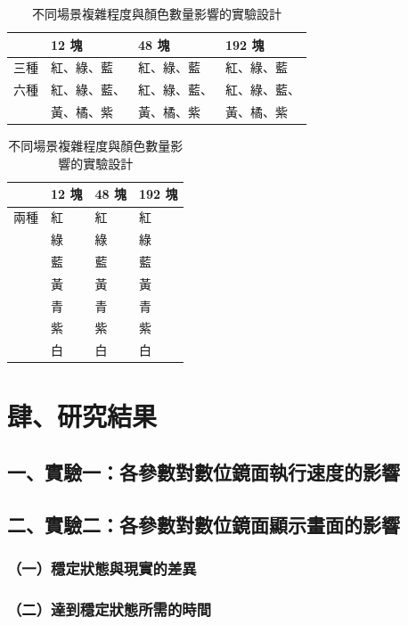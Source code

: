 \documentclass[12pt]{article}
\begin{document}
\begin{table}[h]
  \centering
  \caption{不同場景複雜程度與顏色數量影響的實驗設計}\label{table:sc3_des}
  \begin{tabular}{p{1cm}p{3cm}p{3cm}p{3cm}}
    \toprule
    & 12 塊 & 48 塊 & 192 塊 \\ 
    \midrule
    三種 & 紅、綠、藍 & 紅、綠、藍 & 紅、綠、藍 \\ 
    六種 & 紅、綠、藍、 & 紅、綠、藍、 & 紅、綠、藍、 \\ 
    & 黃、橘、紫 & 黃、橘、紫 & 黃、橘、紫 \\ 
    \bottomrule
  \end{tabular}
  \begin{tabular}{p{1cm}p{3cm}p{3cm}p{3cm}}
    \toprule
    & 12 塊 & 48 塊 & 192 塊 \\ 
    \midrule
    兩種 & 紅 & 紅 & 紅 \\ 
    & 綠 & 綠 & 綠 \\ 
    & 藍 & 藍 & 藍 \\ 
    & 黃 & 黃 & 黃 \\ 
    & 青 & 青 & 青 \\ 
    & 紫 & 紫 & 紫 \\ 
    & 白 & 白 & 白 \\ 
    \bottomrule
  \end{tabular}
\end{table}

\newpage

\section{肆、研究結果}

\subsection{一、實驗一：各參數對數位鏡面執行速度的影響}

\subsection{二、實驗二：各參數對數位鏡面顯示畫面的影響}

\subsubsection{（一）穩定狀態與現實的差異}

\subsubsection{（二）達到穩定狀態所需的時間}
\end{document}
